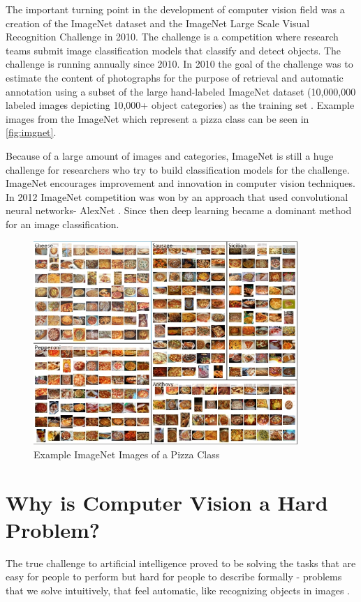 The important turning point in the development of computer vision field was a creation of the ImageNet dataset and the ImageNet Large Scale Visual Recognition Challenge in 2010. The challenge is a competition where research teams submit image classification models that classify and detect objects. The challenge is running annually since 2010. In 2010 the goal of the challenge was to estimate the content of photographs for the purpose of retrieval and automatic annotation using a subset of the large hand-labeled ImageNet dataset (10,000,000 labeled images depicting 10,000+ object categories) as the training set \citep{ImageNet} . Example images  from the ImageNet which represent a pizza class can be seen in \autoref{fig:imgnet}.


Because of a  large amount of images and categories, ImageNet  is still a huge challenge for researchers who try to build classification models for the challenge.  ImageNet encourages improvement and innovation in computer vision techniques. In 2012 ImageNet competition was won by an approach that used convolutional neural networks- AlexNet \citep{alex}. Since then deep learning became a dominant method for an image classification. 


 \begin{figure}[h]
\centering
\includegraphics[width=10cm]{Figures/2/imgnet.PNG}
\caption{Example ImageNet Images of a Pizza Class }
\label{fig:imgnet}
\end{figure}


\section{Why is Computer Vision a Hard Problem?}
The true challenge to artificial intelligence proved to be solving the tasks that are easy for people to perform but hard for people to describe formally - problems that we solve intuitively, that feel automatic, like recognizing objects in images \citep{Goodfellow-et-al-2017}.

